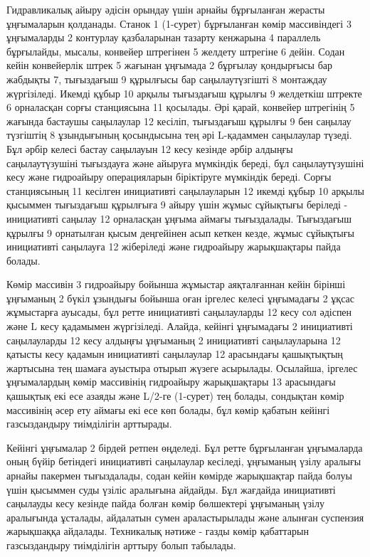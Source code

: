 \begin{multicols}{2}
Гидравликалық айыру әдісін орындау үшін арнайы бұрғыланған жерасты
ұңғымаларын қолданады. Станок 1 (1-сурет) бұрғыланған көмір массивіндегі
3 ұңғымаларды 2 контурлау қазбаларынан тазарту кенжарына 4 параллель
бұрғылайды, мысалы, конвейер штрегінен 5 желдету штрегіне 6 дейін. Содан
кейін конвейерлік штрек 5 жағынан ұңғымада 2 бұрғылау қондырғысы бар
жабдықты 7, тығыздағыш 9 құрылғысы бар саңылаутүзгішті 8 монтаждау
жүргізіледі. Икемді құбыр 10 арқылы тығыздағыш құрылғы 9 желдеткіш
штректе 6 орналасқан сорғы станциясына 11 қосылады. Әрі қарай, конвейер
штрегінің 5 жағында бастаушы саңылаулар 12 кесіліп, тығыздағыш құрылғы 9
бен саңылау түзгіштің 8 ұзындығының қосындысына тең әрі L-қадаммен
саңылаулар түзеді. Бұл әрбір келесі бастау саңылауын 12 кесу кезінде
әрбір алдыңғы саңылаутүзушіні тығыздауға және айыруға мүмкіндік береді,
бұл саңылаутүзушіні кесу және гидроайыру операцияларын біріктіруге
мүмкіндік береді. Сорғы станциясының 11 кесілген инициативті
саңылауларын 12 икемді құбыр 10 арқылы қысыммен тығыздағыш құрылғыға 9
айыру үшін жұмыс сұйықтығы беріледі - инициативті саңылау 12 орналасқан
ұңғыма аймағы тығыздалады. Тығыздағыш құрылғы 9 орнатылған қысым
деңгейінен асып кеткен кезде, жұмыс сұйықтығы инициативті саңылауға 12
жіберіледі және гидроайыру жарықшақтары пайда болады.

Көмір массивін 3 гидроайыру бойынша жұмыстар аяқталғаннан кейін бірінші
ұңғыманың 2 бүкіл ұзындығы бойынша оған іргелес келесі ұңғымадағы 2
ұқсас жұмыстарға ауысады, бұл ретте инициативті саңылауларды 12 кесу сол
әдіспен және L кесу қадамымен жүргізіледі. Алайда, кейінгі ұңғымадағы 2
инициативті саңылауларды 12 кесу алдыңғы ұңғыманың 2 инициативті
саңылауларына 12 қатысты кесу қадамын инициативті саңылаулар 12
арасындағы қашықтықтың жартысына тең шамаға ауыстыра отырып жүзеге
асырылады. Осылайша, іргелес ұңғымалардың көмір массивінің гидроайыру
жарықшақтары 13 арасындағы қашықтық екі есе азаяды және L/2-ге (1-сурет)
тең болады, сондықтан көмір массивінің әсер ету аймағы екі есе көп
болады, бұл көмір қабатын кейінгі газсыздандыру тиімділігін арттырады.

Кейінгі ұңғымалар 2 бірдей ретпен өңделеді. Бұл ретте бұрғыланған
ұңғымаларда оның бүйір бетіндегі инициативті саңылаулар кесіледі,
ұңғыманың үзілу аралығы арнайы пакермен тығыздалады, содан кейін көмірде
жарықшақтар пайда болуы үшін қысыммен суды үзіліс аралығына айдайды. Бұл
жағдайда инициативті саңылауды кесу кезінде пайда болған көмір
бөлшектері ұңғыманың үзілу аралығында ұсталады, айдалатын сумен
араластырылады және алынған суспензия жарықшаққа айдалады. Техникалық
нәтиже - газды көмір қабаттарын газсыздандыру тиімділігін арттыру болып
табылады.


\end{multicols}
